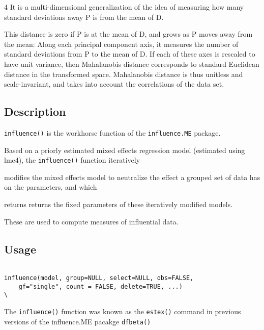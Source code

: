 4 It is a multi-dimensional generalization of the idea of measuring how many standard deviations away P is from the mean of D. 

This distance is zero if P is at the mean of D, and grows as P moves away from the mean: Along each principal component axis, it measures the 
number of standard deviations from P to the mean of D. If each of these axes is rescaled to have unit variance, then Mahalanobis distance corresponds to standard Euclidean distance in the transformed space. Mahalanobis distance is thus unitless and scale-invariant, and takes into account the correlations of the data set.

\subsection*{Description
}
\texttt{influence()} is the workhorse function of the \texttt{influence.ME} package. 


Based on a priorly estimated mixed effects regression model (estimated using lme4), the \texttt{influence()} function iteratively 

modifies the mixed effects model to neutralize the effect a grouped set of data has on the parameters, and which 

returns returns the fixed parameters of these iteratively modified models. 

These are used to compute measures of influential data.




\subsection*{Usage
}
\begin{framed}
\begin{verbatim}

influence(model, group=NULL, select=NULL, obs=FALSE, 
    gf="single", count = FALSE, delete=TRUE, ...)
\
\end{verbatim}
\end{framed}


The \texttt{influence()} function was known as the \texttt{estex()} command in previous versions of the influence.ME pacakge
\texttt{dfbeta()}


